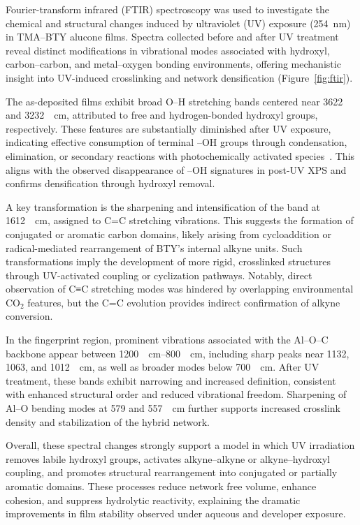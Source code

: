 Fourier-transform infrared (FTIR) spectroscopy was used to investigate the chemical and structural changes induced by ultraviolet (UV) exposure (\SI{254}{\nano\meter}) in TMA–BTY alucone films. Spectra collected before and after UV treatment reveal distinct modifications in vibrational modes associated with hydroxyl, carbon–carbon, and metal–oxygen bonding environments, offering mechanistic insight into UV-induced crosslinking and network densification (Figure~\ref{fig:ftir}).

The as-deposited films exhibit broad O–H stretching bands centered near 3622 and 3232~\si{\per\centi\meter}, attributed to free and hydrogen-bonded hydroxyl groups, respectively. These features are substantially diminished after UV exposure, indicating effective consumption of terminal –OH groups through condensation, elimination, or secondary reactions with photochemically activated species~\cite{REF}. This aligns with the observed disappearance of –OH signatures in post-UV XPS and confirms densification through hydroxyl removal.

A key transformation is the sharpening and intensification of the band at \SI{1612}{\per\centi\meter}, assigned to C=C stretching vibrations. This suggests the formation of conjugated or aromatic carbon domains, likely arising from cycloaddition or radical-mediated rearrangement of BTY’s internal alkyne units. Such transformations imply the development of more rigid, crosslinked structures through UV-activated coupling or cyclization pathways. Notably, direct observation of C≡C stretching modes was hindered by overlapping environmental CO$_2$ features, but the C=C evolution provides indirect confirmation of alkyne conversion.

In the fingerprint region, prominent vibrations associated with the Al–O–C backbone appear between \SIrange{1200}{800}{\per\centi\meter}, including sharp peaks near 1132, 1063, and 1012~\si{\per\centi\meter}, as well as broader modes below 700~\si{\per\centi\meter}. After UV treatment, these bands exhibit narrowing and increased definition, consistent with enhanced structural order and reduced vibrational freedom. Sharpening of Al–O bending modes at 579 and 557~\si{\per\centi\meter} further supports increased crosslink density and stabilization of the hybrid network.

Overall, these spectral changes strongly support a model in which UV irradiation removes labile hydroxyl groups, activates alkyne–alkyne or alkyne–hydroxyl coupling, and promotes structural rearrangement into conjugated or partially aromatic domains. These processes reduce network free volume, enhance cohesion, and suppress hydrolytic reactivity, explaining the dramatic improvements in film stability observed under aqueous and developer exposure.


